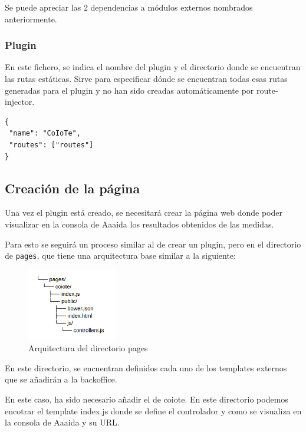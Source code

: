 Se puede apreciar las 2 dependencias a módulos externos nombrados anteriormente. 

\subsubsection{Plugin} 

En este fichero, se indica el nombre del plugin y el directorio donde se encuentran
las rutas estáticas. Sirve para especificar dónde se encuentran todas esas rutas generadas para el plugin y no han sido creadas automáticamente por route-injector. 

\begin{verbatim}
{
 "name": "CoIoTe",
 "routes": ["routes"]
}
\end{verbatim}

\subsection{Creación de la página}

Una vez el plugin está creado, se necesitará crear la página web donde poder visualizar en la consola de Aaaida los resultados obtenidos de las medidas. 

Para esto se seguirá un proceso similar al de crear un plugin, pero en el directorio de \texttt{pages}, que tiene una arquitectura base similar a la siguiente:  

\begin{figure}[htb]
\begin{center}
\includegraphics[width=0.35\textwidth]{./setup/arc2}
\caption{Arquitectura del directorio pages}
\end{center}
\end{figure}


En este directorio, se encuentran definidos cada uno de los templates externos que se añadirán a la backoffice.

En este caso, ha sido necesario añadir el de coiote. En este directorio podemos encotrar el template index.js donde se define el controlador y como se visualiza en la consola de Aaaida y su URL. 

